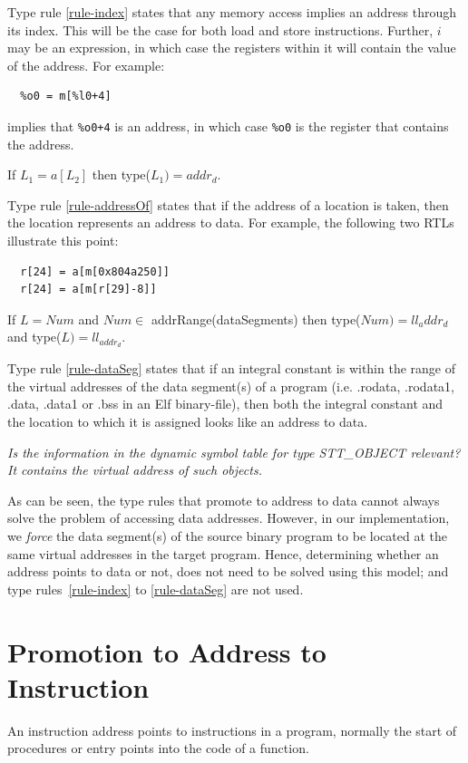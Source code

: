 Type rule \ref{rule-index} states that any memory access implies an address 
through its index.  This will be the case for both load and store 
instructions.  Further, $i$ may be an expression, in which case 
the registers within it will contain the value of the address. 
For example:
\begin{verbatim}
  %o0 = m[%l0+4] 
\end{verbatim}
implies that \texttt{\%o0+4} is an address, in which case 
\texttt{\%o0} is the register that contains the address.  

\begin{typerule}
If $L_1 = a[L_2]$ then type($L_1) = addr_d$.
\label{rule-addressOf}
\end{typerule}

Type rule \ref{rule-addressOf} states that if the address of a location is 
taken, then the location represents an address to data.  For example,
the following two RTLs illustrate this point:
\begin{verbatim}
  r[24] = a[m[0x804a250]]
  r[24] = a[m[r[29]-8]]
\end{verbatim}

\begin{typerule}
If $L = Num$ and $Num \in$ addrRange(dataSegments) then type($Num) = ll_addr_d$ 
and type($L) = ll_{addr_d}$.
\label{rule-dataSeg}
\end{typerule}

Type rule \ref{rule-dataSeg} states that if an integral constant is within 
the range of the virtual addresses of the data segment(s) of a program (i.e. 
.rodata, .rodata1, .data, .data1 or .bss in an Elf binary-file), then 
both the integral constant and the location to which it is assigned 
looks like an address to data.  

\emph{Is the information in the dynamic symbol table for type STT\_OBJECT 
relevant?  It contains the virtual address of such objects.}

As can be seen, the type rules that promote to address to data cannot
always solve the problem of accessing data addresses.  However, in 
our implementation, we \emph{force} the data segment(s) of the source 
binary program to be located at the same virtual addresses in the
target program.  Hence, determining whether an address points to 
data or not, does not need to be solved using this model; and 
type rules~\ref{rule-index} to \ref{rule-dataSeg} are not used. 


\section{Promotion to Address to Instruction}
An instruction address points to instructions in a program, normally
the start of procedures or entry points into the code of a function. 

